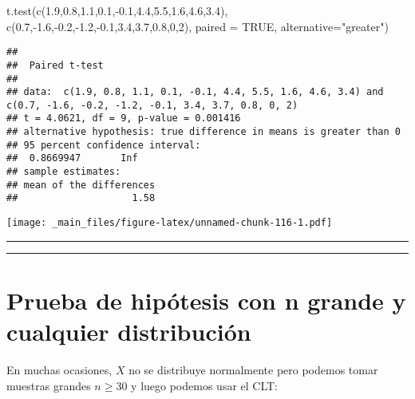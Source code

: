 \documentclass[
]{book}
\newenvironment{Shaded}{\begin{snugshade}}{\end{snugshade}}
\newcommand{\AttributeTok}[1]{\textcolor[rgb]{0.77,0.63,0.00}{#1}}
\newcommand{\ConstantTok}[1]{\textcolor[rgb]{0.00,0.00,0.00}{#1}}
\newcommand{\DecValTok}[1]{\textcolor[rgb]{0.00,0.00,0.81}{#1}}
\newcommand{\FloatTok}[1]{\textcolor[rgb]{0.00,0.00,0.81}{#1}}
\newcommand{\FunctionTok}[1]{\textcolor[rgb]{0.00,0.00,0.00}{#1}}
\newcommand{\NormalTok}[1]{#1}
\newcommand{\SpecialCharTok}[1]{\textcolor[rgb]{0.00,0.00,0.00}{#1}}
\newcommand{\StringTok}[1]{\textcolor[rgb]{0.31,0.60,0.02}{#1}}
\begin{document}
\begin{Shaded}
\begin{Highlighting}[]
\FunctionTok{t.test}\NormalTok{(}\FunctionTok{c}\NormalTok{(}\FloatTok{1.9}\NormalTok{,}\FloatTok{0.8}\NormalTok{,}\FloatTok{1.1}\NormalTok{,}\FloatTok{0.1}\NormalTok{,}\SpecialCharTok{{-}}\FloatTok{0.1}\NormalTok{,}\FloatTok{4.4}\NormalTok{,}\FloatTok{5.5}\NormalTok{,}\FloatTok{1.6}\NormalTok{,}\FloatTok{4.6}\NormalTok{,}\FloatTok{3.4}\NormalTok{),}
       \FunctionTok{c}\NormalTok{(}\FloatTok{0.7}\NormalTok{,}\SpecialCharTok{{-}}\FloatTok{1.6}\NormalTok{,}\SpecialCharTok{{-}}\FloatTok{0.2}\NormalTok{,}\SpecialCharTok{{-}}\FloatTok{1.2}\NormalTok{,}\SpecialCharTok{{-}}\FloatTok{0.1}\NormalTok{,}\FloatTok{3.4}\NormalTok{,}\FloatTok{3.7}\NormalTok{,}\FloatTok{0.8}\NormalTok{,}\DecValTok{0}\NormalTok{,}\DecValTok{2}\NormalTok{),}
       \AttributeTok{paired =} \ConstantTok{TRUE}\NormalTok{,}
       \AttributeTok{alternative=}\StringTok{"greater"}\NormalTok{)}
\end{Highlighting}
\end{Shaded}

\begin{verbatim}
## 
##  Paired t-test
## 
## data:  c(1.9, 0.8, 1.1, 0.1, -0.1, 4.4, 5.5, 1.6, 4.6, 3.4) and c(0.7, -1.6, -0.2, -1.2, -0.1, 3.4, 3.7, 0.8, 0, 2)
## t = 4.0621, df = 9, p-value = 0.001416
## alternative hypothesis: true difference in means is greater than 0
## 95 percent confidence interval:
##  0.8669947       Inf
## sample estimates:
## mean of the differences 
##                    1.58
\end{verbatim}

\texttt{[image: \_main\_files/figure-latex/unnamed-chunk-116-1.pdf]}

\begin{center}\rule{0.5\linewidth}{0.5pt}\end{center}

\begin{center}\rule{0.5\linewidth}{0.5pt}\end{center}

\hypertarget{prueba-de-hipuxf3tesis-con-n-grande-y-cualquier-distribuciuxf3n}{%
\section{Prueba de hipótesis con n grande y cualquier distribución}\label{prueba-de-hipuxf3tesis-con-n-grande-y-cualquier-distribuciuxf3n}}

En muchas ocasiones, \(X\) no se distribuye normalmente pero podemos tomar muestras grandes \(n \ge 30\) y luego podemos usar el CLT:
\end{document}
